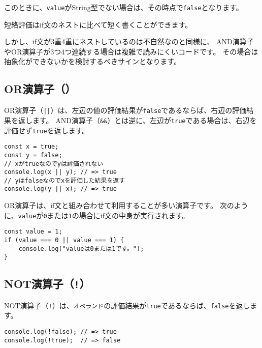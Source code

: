 このときに、\texttt{value}がString型でない場合は、その時点で\texttt{false}となります。

短絡評価はif文のネストに比べて短く書くことができます。

しかし、if文が3重4重にネストしているのは不自然なのと同様に、
AND演算子やOR演算子が3つ4つ連続する場合は複雑で読みにくいコードです。
その場合は抽象化ができないかを検討するべきサインとなります。

\hypertarget{or-operator}{%
\subsection{\texorpdfstring{OR演算子（\texttt{\textbar{}\textbar{}}）}{OR演算子（\textbar{}\textbar{}）}}\label{or-operator}}

OR演算子（\texttt{||}）は、左辺の値の評価結果が\texttt{false}であるならば、右辺の評価結果を返します。
AND演算子（\texttt{\&\&}）とは逆に、左辺が\texttt{true}である場合は、右辺を評価せず\texttt{true}を返します。

\begin{lstlisting}
const x = true;
const y = false;
// xがtrueなのでyは評価されない
console.log(x || y); // => true
// yはfalseなのでxを評価した結果を返す
console.log(y || x); // => true
\end{lstlisting}

OR演算子は、if文と組み合わせて利用することが多い演算子です。
次のように、\texttt{value}が\texttt{0}または\texttt{1}の場合にif文の中身が実行されます。

\begin{lstlisting}
const value = 1;
if (value === 0 || value === 1) {
    console.log("valueは0または1です。");
}
\end{lstlisting}

\hypertarget{not-operator}{%
\subsection{\texorpdfstring{NOT演算子（\texttt{!}）}{NOT演算子（!）}}\label{not-operator}}

NOT演算子（\texttt{!}）は、\texttt{オペランド}の評価結果が\texttt{true}であるならば、\texttt{false}を返します。

\begin{lstlisting}
console.log(!false); // => true
console.log(!true);  // => false
\end{lstlisting}


